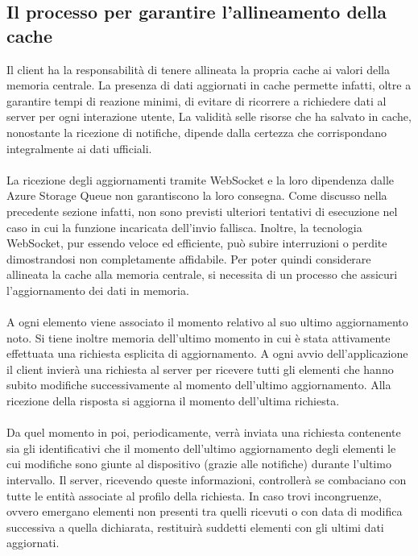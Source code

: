 \subsection{Il processo per garantire l'allineamento della cache}

Il client ha la responsabilità di tenere allineata
la propria cache ai valori della memoria centrale. 
La presenza di dati aggiornati in cache permette infatti,
oltre a garantire tempi di reazione minimi,
di evitare di ricorrere a richiedere dati al server per ogni interazione utente, 
La validità selle risorse che ha salvato in cache,
nonostante la ricezione di notifiche, 
dipende dalla certezza che corrispondano integralmente ai dati ufficiali.\\
\\
La ricezione degli aggiornamenti tramite WebSocket e 
la loro dipendenza dalle Azure Storage Queue non garantiscono la loro consegna.
Come discusso nella precedente sezione infatti, 
non sono previsti ulteriori tentativi di esecuzione nel caso in cui 
la funzione incaricata dell'invio fallisca.
Inoltre, la tecnologia WebSocket, pur essendo veloce ed efficiente, 
può subire interruzioni o perdite dimostrandosi non completamente affidabile.
Per poter quindi considerare allineata la cache alla memoria centrale, 
si necessita di un processo che assicuri l'aggiornamento dei dati in memoria.\\
\\
A ogni elemento viene associato il momento relativo al suo ultimo aggiornamento noto.
Si tiene inoltre memoria dell'ultimo momento in cui è stata 
attivamente effettuata una richiesta esplicita di aggiornamento.  
A ogni avvio dell'applicazione il client invierà una richiesta al server 
per ricevere tutti gli elementi che hanno subito modifiche 
successivamente al momento dell'ultimo aggiornamento.
Alla ricezione della risposta si aggiorna il momento dell'ultima richiesta.\\
\\
Da quel momento in poi, periodicamente, 
verrà inviata una richiesta contenente sia gli identificativi che il momento dell'ultimo aggiornamento 
degli elementi le cui modifiche sono giunte al dispositivo (grazie alle notifiche) durante l'ultimo intervallo.
Il server, ricevendo queste informazioni, controllerà se combaciano con tutte le entità 
associate al profilo della richiesta.
In caso trovi incongruenze, ovvero emergano elementi non presenti tra quelli ricevuti o 
con data di modifica successiva a quella dichiarata, 
restituirà suddetti elementi con gli ultimi dati aggiornati.\\
\\
\clearpage